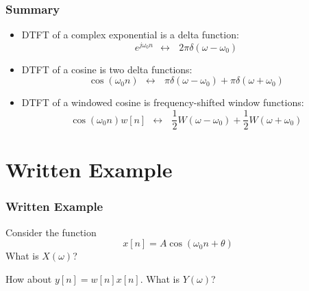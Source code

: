 \documentclass{beamer}
\begin{document}
\begin{frame}
  \frametitle{Summary}

  \begin{itemize}
  \item DTFT of a complex exponential is a delta function:
    \begin{displaymath}
      e^{j\omega_0 n}~~\leftrightarrow~~~2\pi\delta(\omega-\omega_0)
    \end{displaymath}
  \item DTFT of a cosine is two delta functions:
    \begin{displaymath}
      \cos(\omega_0 n)~~\leftrightarrow~~~\pi\delta(\omega-\omega_0)+\pi\delta(\omega+\omega_0)
    \end{displaymath}
  \item DTFT of a windowed cosine is frequency-shifted window functions:
    \begin{displaymath}
      \cos(\omega_0 n)w[n]~~\leftrightarrow~~~\frac{1}{2}W(\omega-\omega_0)+\frac{1}{2}W(\omega+\omega_0)
    \end{displaymath}
  \end{itemize}
\end{frame}

\section[Example]{Written Example}
\setcounter{subsection}{1}

\begin{frame}
  \frametitle{Written Example}

  Consider the function
  \[
  x[n] = A \cos(\omega_0 n+\theta)
  \]
  What is $X(\omega)$?

  How about $y[n]=w[n]x[n]$.  What is $Y(\omega)$?
\end{frame}
\end{document}
